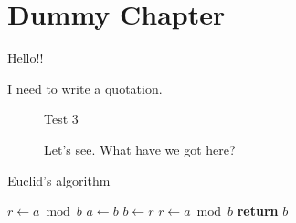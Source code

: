 \chapter{Dummy Chapter}

Hello!!

I need to write a quotation.

\begin{quotation}
\lipsum[1-2]
\end{quotation}

\begin{figure}[hbt!]
\centering Test 3
\caption{Let's see. What have we got here?}
\end{figure}

\begin{algorithm}
\caption{Euclid's algorithm}\label{euclid}
\begin{algorithmic}[1]
   \State $r\gets a\bmod b$
      \State $a\gets b$
      \State $b\gets r$
      \State $r\gets a\bmod b$
   \EndWhile\label{euclidendwhile}
   \State \textbf{return} $b$
\EndProcedure
\end{algorithmic}
\end{algorithm}